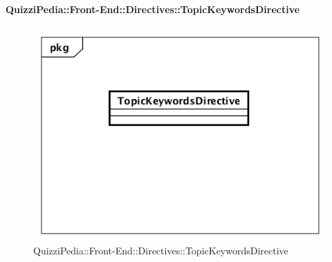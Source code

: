 \paragraph{QuizziPedia::Front-End::Directives::TopicKeywordsDirective}

\label{QuizziPedia::Front-End::Directives::TopicKeywordsDirective}

\begin{figure}[h]
	\centering
	\includegraphics[scale=0.5,keepaspectratio]{UML/Classi/Front-End/QuizziPedia_Front-end_Directives_TopicKeywordsDirective.png}
	\caption{QuizziPedia::Front-End::Directives::TopicKeywordsDirective}
\end{figure}


